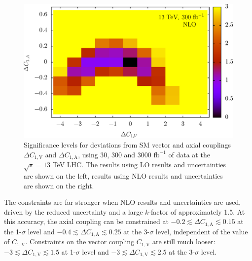 \documentclass[preprint]{JHEP3} %
\def\invfb {\mathrm{fb}^{-1}}
\def\ConeV{C_{1,\mathrm{V}}}
\def\DConeA{\Delta C_{1,\mathrm{A}}}
\def\DConeV{\Delta C_{1,\mathrm{V}}}
\begin{document}
\begin{figure}[t]
\includegraphics[scale=0.5]{LHC_53_LLSign_13NLO3000.eps} 
\caption{\label{fig:ix} Significance levels for deviations from SM vector and axial couplings $\DConeV$ and $\DConeA$,  using 30, 300 and 3000 $\invfb$ of data at the $\sqrt{s}=13$ TeV LHC. 
The results using LO results and uncertainties are shown on the left, results using NLO results and uncertainties are shown on the right.}
\end{figure}


The constraints are far stronger when NLO results and uncertainties are used, driven by the reduced uncertainty and a large $k$-factor of approximately 1.5. 
At this accuracy, the axial coupling can be constrained at $-0.2 \lesssim \DConeA \lesssim 0.15$ at the 1-$\sigma$ level and $-0.4 \lesssim \DConeA \lesssim 0.25$ 
at the 3-$\sigma$ level, independent of the value of $\ConeV$. Constraints on the vector coupling $\ConeV$ are still much looser: 
$-3 \lesssim \DConeV \lesssim 1.5$ at 1-$\sigma$ level and $-3 \lesssim \DConeV \lesssim 2.5$ at the 3-$\sigma$ level.
\end{document}
